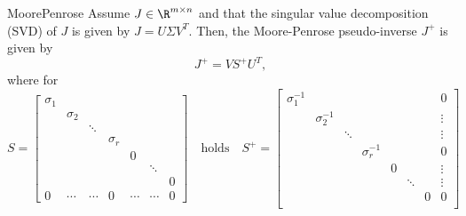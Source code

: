 \begin{theo}{MoorePenrose}
    Assume $J \in \R^{m \times n}$ and that the singular value decomposition (SVD) of $J$ is given by $J = U \Sigma V^T$. Then, the Moore-Penrose pseudo-inverse $J^+$ is given by
    \begin{equation*}
        J^+ = V S^+ U^T,
    \end{equation*}
    where for
    \begin{equation*}
    S = 
        \left[
        \begin{array}{ccccccc}
        \sigma_1 &  &  &  &  &  \\
         & \sigma_2 &  &  &  &  \\
         &  & \ddots &  &  & \\
         &  &  & \sigma_r &  & \\
         &  &  &  & 0 & & \\
         &  &  &  & & \ddots & \\
         &  &  &  & & & 0 \\
        \hline
        0 & \cdots & \cdots & 0 & \cdots & \cdots & 0
        \end{array}
        \right]
    \quad \text{holds} \quad
    S^+ = 
        \left[
        \begin{array}{ccccccc|c}
            \sigma_1^{-1} &  &  &  &  & & & 0\\
            & \sigma_2^{-1} &  &  &  & &  & \vdots \\
            &  & \ddots &  &  & & & \vdots \\
            &  &  & \sigma_r^{-1} & & & & 0\\
            &  &  &  & 0 & & & \vdots\\
            &  &  &  & & \ddots &  & \vdots\\
            &  &  &  & & & 0 & 0\\
        \end{array}
        \right]
    \end{equation*}
\end{theo}

